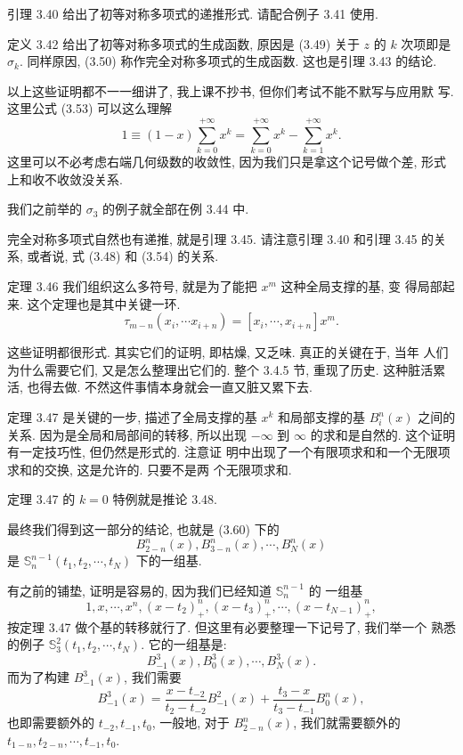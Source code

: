 \documentclass[a4paper]{ctexart}
\begin{document}
{引理 3.40 给出了初等对称多项式的递推形式. 请配合例子 3.41 使用.

定义 3.42 给出了初等对称多项式的生成函数, 原因是 (3.49) 关于 $z$ 的
$k$ 次项即是 $\sigma_k$. 同样原因, (3.50) 称作完全对称多项式的生成函数.
这也是引理 3.43 的结论.

以上这些证明都不一一细讲了, 我上课不抄书, 但你们考试不能不默写与应用默
写. 这里公式 (3.53) 可以这么理解
$$
1 \equiv (1 - x)\sum_{k = 0}^{+\infty} x^k = \sum_{k =
  0}^{+\infty}x^k - \sum_{k = 1}^{+\infty} x^k.
$$
这里可以不必考虑右端几何级数的收敛性, 因为我们只是拿这个记号做个差,
形式上和收不收敛没关系.

我们之前举的 $\sigma_3$ 的例子就全部在例 3.44 中.

完全对称多项式自然也有递推, 就是引理 3.45. 请注意引理 3.40 和引理 3.45 的关系, 或者说,
式 (3.48) 和 (3.54) 的关系.

定理 3.46 我们组织这么多符号, 就是为了能把 $x^m$ 这种全局支撑的基, 变
得局部起来. 这个定理也是其中关键一环.
$$
\tau_{m - n}(x_i, \cdots x_{i + n}) = [x_i, \cdots, x_{i + n}] x^m.
$$

这些证明都很形式. 其实它们的证明, 即枯燥, 又乏味. 真正的关键在于, 当年
人们为什么需要它们, 又是怎么整理出它们的. 整个 3.4.5 节, 重现了历史.
这种脏活累活, 也得去做. 不然这件事情本身就会一直又脏又累下去.

定理 3.47 是关键的一步, 描述了全局支撑的基 $x^k$ 和局部支撑的基
$B_i^n(x)$ 之间的关系. 因为是全局和局部间的转移, 所以出现 $-\infty$ 到
$\infty$ 的求和是自然的. 这个证明有一定技巧性, 但仍然是形式的. 注意证
明中出现了一个有限项求和和一个无限项求和的交换, 这是允许的. 只要不是两
个无限项求和.

定理 3.47 的 $k = 0$ 特例就是推论 3.48.

最终我们得到这一部分的结论, 也就是 (3.60) 下的
$$
B_{2 - n}^n(x), B_{3 - n}^n(x), \cdots, B_{N}^n(x)
$$
是 $\mathbb{S}_n^{n - 1}(t_1, t_2, \cdots, t_N)$ 下的一组基.

有之前的铺垫, 证明是容易的, 因为我们已经知道 $\mathbb{S}_n^{n - 1}$ 的
一组基
$$
1, x, \cdots, x^n, (x - t_2)_+^n, (x - t_3)_+^n, \cdots, (x - t_{N - 1})_+^n,
$$
按定理 3.47 做个基的转移就行了. 但这里有必要整理一下记号了, 我们举一个
熟悉的例子 $\mathbb{S}_3^2(t_1, t_2, \cdots, t_N)$. 它的一组基是:
$$
B_{-1}^3(x), B_{0}^3(x), \cdots, B_N^3(x).
$$
而为了构建 $B_{-1}^3(x)$, 我们需要
$$
B_{-1}^3(x) = \frac{x - t_{-2}}{t_2 - t_{-2}}B_{-1}^2(x) +
\frac{t_{3} - x}{t_3 - t_{-1}}B_{0}^n(x),
$$
也即需要额外的 $t_{-2}, t_{-1}, t_0$, 一般地, 对于 $B_{2 - n}^n(x)$,
我们就需要额外的$t_{1 - n}, t_{2 - n}, \cdots, t_{-1}, t_0$.

}
\end{document}
